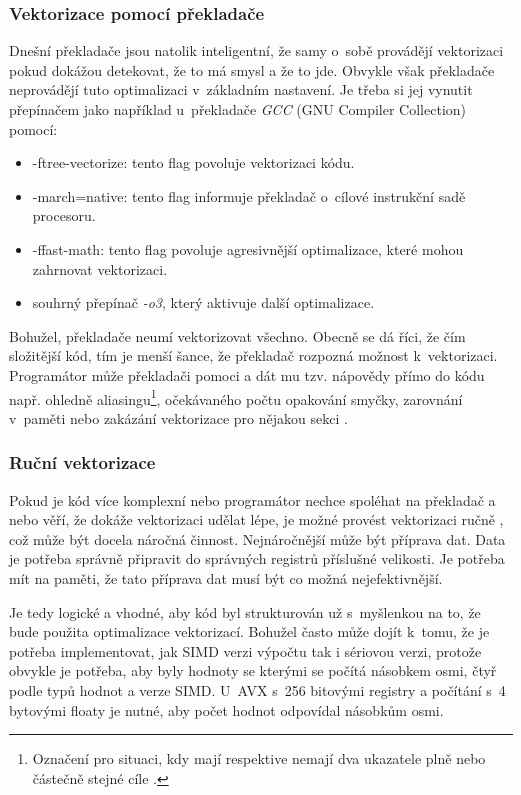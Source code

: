 \subsubsection{Vektorizace pomocí překladače}
Dnešní překladače jsou natolik inteligentní, že samy o~sobě provádějí vektorizaci pokud dokážou detekovat, že to má smysl a že to jde. Obvykle však překladače neprovádějí tuto optimalizaci v~základním nastavení. Je třeba si jej vynutit přepínačem jako například u~překladače \emph{GCC} (GNU Compiler Collection) pomocí:
\begin{itemize}
    \item -ftree-vectorize: tento flag povoluje vektorizaci kódu.
    \item -march=native: tento flag informuje překladač o~cílové instrukční sadě procesoru.
    \item -ffast-math: tento flag povoluje agresivnější optimalizace, které mohou zahrnovat vektorizaci.
    \item souhrný přepínač \emph{-o3}, který aktivuje další optimalizace.
\end{itemize}


Bohužel, překladače neumí vektorizovat všechno. Obecně se dá říci, že čím složitější kód, tím je menší šance, že překladač rozpozná možnost k~vektorizaci. Programátor může překladači pomoci a dát mu tzv. nápovědy přímo do kódu např. ohledně aliasingu\footnote{Označení pro situaci, kdy mají respektive nemají dva ukazatele plně nebo částečně stejné cíle \cite{intel2023autovectorization}.}, očekávaného počtu opakování smyčky, zarovnání v~paměti nebo zakázání vektorizace pro nějakou sekci \cite{gcc_tree_ssa_vectorization}.


\subsubsection{Ruční vektorizace}
Pokud je kód více komplexní nebo programátor nechce spoléhat na překladač a nebo věří, že dokáže vektorizaci udělat lépe, je možné provést vektorizaci ručně \cite{gcc_vector}, což může být docela náročná činnost. Nejnáročnější může být příprava dat. Data je potřeba správně připravit do správných registrů příslušné velikosti. Je potřeba mít na paměti, že tato příprava dat musí být co možná nejefektivnější.

Je tedy logické a vhodné, aby kód byl strukturován už s~myšlenkou na to, že bude použita optimalizace vektorizací. Bohužel často může dojít k~tomu, že je potřeba implementovat, jak SIMD verzi výpočtu tak i sériovou verzi, protože obvykle je potřeba, aby byly hodnoty se kterými se počítá násobkem osmi, čtyř podle typů hodnot a verze SIMD. U~AVX s~256 bitovými registry a počítání s~4 bytovými floaty je nutné, aby počet hodnot odpovídal násobkům osmi.

